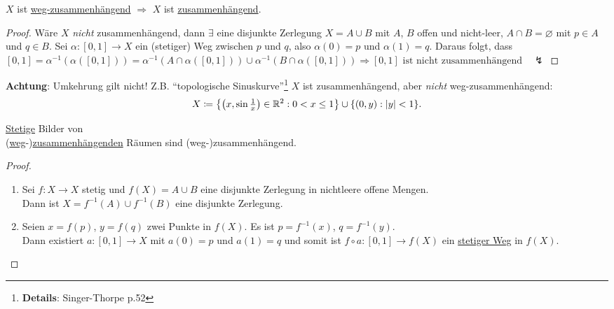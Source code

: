 \begin{lemma}
  $ X $ ist \hyperref[def:wegzusammenhaengend]{weg-zusammenhängend} $ \Rightarrow $ $ X $ ist \hyperref[def:zusammenhaengend]{zusammenhängend}.
  \begin{proof}
    Wäre $ X $ \emph{nicht} zusammenhängend, dann $ \exists $ eine disjunkte Zerlegung $ X = A \cup B $ mit $ A $, $ B $ offen und nicht-leer, $ A \cap B = \varnothing $ mit $ p \in A $ und $ q \in B $. Sei $ \alpha: [0,1] \to X $ ein (stetiger) Weg zwischen $ p $ und $ q $, also $ \alpha(0) = p $ und $ \alpha(1) = q $. Daraus folgt, dass $ [0,1] = \alpha^{-1}(\alpha([0,1])) = \alpha^{-1}(A \cap \alpha([0,1])) \cup \alpha^{-1}(B \cap \alpha([0,1])) \Rightarrow [0,1] \text{ ist nicht zusammenhängend} \quad \lightning $
  \end{proof}
  \textbf{Achtung}: Umkehrung gilt nicht! Z.B. ``topologische Sinuskurve''\footnote{\textbf{Details}: Singer-Thorpe p.52} $ X $ ist zusammenhängend, aber \emph{nicht} weg-zusammenhängend:
  \begin{equation*}
    X \coloneqq \left\{ \left( x, \sin\tfrac{1}{x} \right) \in \mathbb{R}^2 : 0 < x \leq 1 \right\} \cup \{ (0,y) : \vert y \vert < 1 \}\text{.}
  \end{equation*}
\end{lemma}

\begin{lemma}
  \hyperref[def:stetig]{Stetige} Bilder von \\ (\hyperref[def:wegzusammenhaengend]{weg}-)\hyperref[def:zusammenhaengend]{zusammenhängenden} Räumen sind (weg-)zusammenhängend.
  \begin{proof}
    \
    \begin{enumerate}
      \item Sei $ f: X \to X $ stetig und $ f(X) = A \cup B $ eine disjunkte Zerlegung in nichtleere offene Mengen. \\
        Dann ist $ X = f^{-1}(A) \cup f^{-1}(B) $ eine disjunkte Zerlegung.
      \item Seien $ x = f(p) $, $ y = f(q) $ zwei Punkte in $ f(X) $. Es ist $ p = f^{-1}(x) $, $ q = f^{-1}(y) $. \\
        Dann existiert $ a: [0,1] \to X $ mit $ a(0) = p $ und $ a(1) = q $ und somit ist $ f \circ a: [0,1] \to f(X) $ ein \hyperref[def:wegzusammenhaengend]{stetiger Weg} in $ f(X) $. 
    \end{enumerate}
  \end{proof}
\end{lemma}

